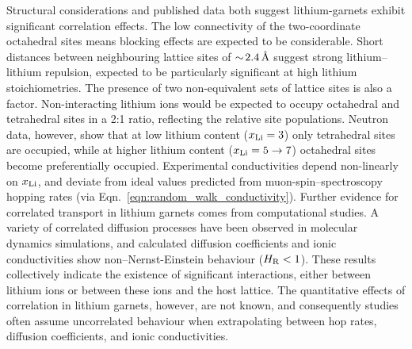 \documentclass[aps,prb,twocolumn,superscriptaddress,reprint]{revtex4-1}
\newcommand{\xLi}{x_\m{Li}}
\newcommand{\angstrom}{\mbox{\normalfont\AA}}
\begin{document}
Structural considerations and published data both suggest lithium-garnets  exhibit significant correlation effects. The low connectivity of the two-coordinate octahedral sites means blocking effects are expected to be considerable.\cite{AwakaEtAl_ChemLett2011} Short distances between neighbouring lattice sites of $\sim\!2.4\,\mathrm{\angstrom}$ suggest strong lithium--lithium repulsion, expected to be particularly significant at high lithium stoichiometries.\cite{OCallaghanAndCussen_ChemComm2007,OCallaghanAndCussen_SolStatSci2008,Cussen_JMaterChem2010,WangEtAl_SolStatIonics2014} The presence of two non-equivalent sets of lattice sites is also a factor. Non-interacting lithium ions would be expected to occupy octahedral and tetrahedral sites in a 2:1 ratio, reflecting the relative site populations. 
Neutron data, however, show that at low lithium content ($\xLi=3$) only tetrahedral sites are occupied,\cite{OCallaghanEtAl_ChemMater2006} while at higher lithium content ($\xLi=5\to7$) octahedral sites become preferentially occupied.\cite{Cussen_JMaterChem2010,ThangaduraiEtAl_JPhysChemLett2015} Experimental conductivities depend non-linearly on $\xLi$,\cite{ThompsonEtAl_AdvEnergyMater2015} and deviate from ideal values predicted from muon-spin--spectroscopy hopping rates (via Eqn.~\ref{eqn:random_walk_conductivity}).\cite{NozakiEtAl_SolStatIonics2014} Further evidence for correlated transport in lithium garnets comes from computational studies. A variety of correlated diffusion processes have been observed in molecular dynamics simulations,\cite{JalemEtAl_ChemMater2013, MeierEtAl_JPhysChemC2014,KlenkAndLai_PhysChemChemPhys2015, BurbanoEtAl_PhysRevLett2016} and calculated diffusion coefficients and ionic conductivities show non--Nernst-Einstein behaviour ($H_{\mathrm{R}}<1$).\cite{KlenkAndLai_SolStatIonics2016} These results collectively indicate the existence of significant interactions, either between lithium ions or between these ions and the host lattice. The quantitative effects of correlation in lithium garnets, however, are not known, and consequently studies often assume uncorrelated behaviour when extrapolating between hop rates, diffusion coefficients, and ionic conductivities.\cite{KuhnEtAl_PhysRevB2011,KuhnEtAl_JPhys-CondensMat2011,MiaraEtAl_ChemMater2013,Rustad_arXiv2016,GuEtAl_SolStatIonics2015,NozakiEtAl_SolStatIonics2014,ZeierEtAl_ACSApplMaterInt2014,JalemEtAl_ChemMater2013,AdamsAndRao_JMaterChem2012,DuvelEtAl_JPhysChemC2012,NarayananEtAl_RSCAdv2012,RamzyAndThangadurai_ACSApplMaterInt2010,AmoresEtAl_JMaterChemA2016}
\end{document}
